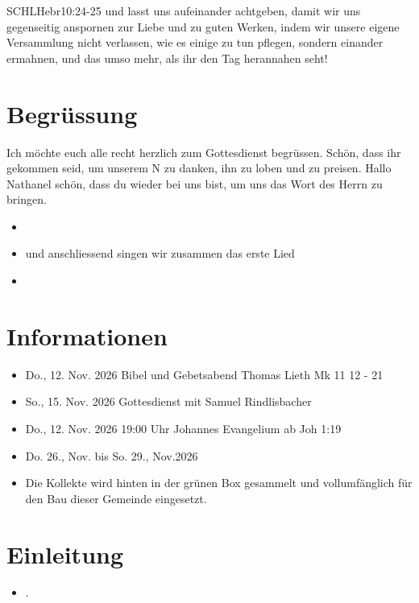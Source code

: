 \documentclass[fontsize=16pt]{mybib}
\author{OTS}
\newcommand{\Name}{Nathanel}
\begin{document}
\begin{bibelbox}{SCHL}{Hebr}{10:24-25}
    und lasst uns aufeinander achtgeben, damit wir uns gegenseitig anspornen zur Liebe und zu guten Werken, indem wir unsere eigene Versammlung nicht verlassen, wie es einige zu tun pflegen, sondern einander ermahnen, und das umso mehr, als ihr den Tag herannahen seht!
\end{bibelbox}
\section{Begrüssung}
Ich möchte euch alle recht herzlich zum Gottesdienst begrüssen. Schön, dass ihr gekommen seid, um unserem \herr N zu danken, ihn zu loben und zu preisen. 
Hallo \Name{} schön, dass du wieder bei uns bist, um uns das Wort des Herrn zu bringen.

\begin{itemize}
    \item {}
    \item und anschliessend singen wir zusammen das erste Lied
    \item {}
\end{itemize}

\section{Informationen}
\begin{itemize}
    \item {} Do., 12. Nov. 2026 Bibel und Gebetsabend Thomas Lieth Mk 11 12 - 21
    \item {} So., 15. Nov. 2026 Gottesdienst  mit Samuel Rindlisbacher
    \item {} Do., 12. Nov. 2026 19:00 Uhr Johannes Evangelium ab Joh 1:19
    \item {} Do. 26., Nov. bis So. 29., Nov.2026 
    \item {} Die Kollekte wird hinten in der grünen Box gesammelt und vollumfänglich für den Bau dieser Gemeinde eingesetzt.
\end{itemize}
\section{Einleitung}

\begin{itemize}
    \item {}.
\end{itemize}
\end{document}
